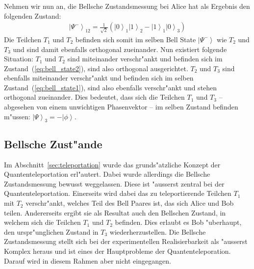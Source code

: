 \begin{refsection}
Nehmen wir nun an, die Bellsche Zustandsmessung bei Alice hat als Ergebnis den folgenden Zustand:
\begin{align}\label{eq:bell_state2}
\left|\Psi^{-}\right\rangle_{12} = \frac{1}{\sqrt{2}} ( \left|0\right\rangle_{1}\left|1\right\rangle_{2} - \left|1\right\rangle_{1}\left|0\right\rangle_{3} )
\end{align}
Die Teilchen $T_{1}$ und $T_{2}$ befinden sich somit im selben Bell State $\left| \Psi^{-} \right \rangle$ wie $T_{2}$ und $T_{3}$ und sind damit ebenfalls orthogonal zueinander. Nun existiert folgende Situation: $T_{1}$ und $T_{2}$ sind miteinander verschr"ankt und befinden sich im Zustand~(\ref{eq:bell_state2}), sind also orthogonal ausgerichtet. $T_{2}$ und $T_{3}$ sind ebenfalls miteinander verschr"ankt und befinden sich im selben Zustand~(\ref{eq:bell_state1}), sind also ebenfalls verschr"ankt und stehen orthogonal zueinander. Dies bedeutet, dass sich die Teilchen $T_{1}$ und $T_{3}$ -- abgesehen von einem unwichtigen Phasenvektor -- im selben Zustand befinden m"ussen: $\left| \Psi\right\rangle_{3} = -\left|\phi\right\rangle$.

\subsection{Bellsche Zust"ande}\label{sec:bell-states}
%

Im Abschnitt~\ref{sec:teleportation} wurde das grunds"atzliche Konzept der Quantenteleportation erl"autert. Dabei wurde allerdings die Bellsche Zustandsmessung bewusst weggelassen. Diese ist "ausserst zentral bei der Quantenteleportation. Einerseits wird dabei das zu teleportierende Teilchen $T_{1}$ mit $T_{2}$ verschr"ankt, welches Teil des Bell Paares ist, das sich Alice und Bob teilen. Andererseits ergibt sie als Resultat auch den Bellschen Zustand, in welchem sich die Teilchen $T_{1}$ und $T_{2}$ befinden. Dies erlaubt es Bob "uberhaupt, den urspr"unglichen Zustand in $T_{3}$ wiederherzustellen. Die Bellsche Zustandsmessung stellt sich bei der experimentellen Realisierbarkeit als "ausserst Komplex heraus und ist eines der Hauptprobleme der Quantenteleporation. Darauf wird in diesem Rahmen aber nicht eingegangen.


\end{refsection}
